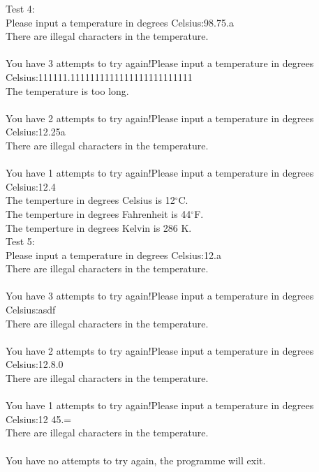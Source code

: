 \documentclass[12pt]{article}
\begin{document}
	\noindent Test 4:\\
	Please input a temperature in degrees Celsius:98.75.a\\
	There are illegal characters in the temperature.\\\\	
	You have 3 attempts to try again!Please input a temperature in degrees Celsius:111111.1111111111111111111111111\\
	The temperature is too long.\\\\	
	You have 2 attempts to try again!Please input a temperature in degrees Celsius:12.25a\\
	There are illegal characters in the temperature.\\\\	
	You have 1 attempts to try again!Please input a temperature in degrees Celsius:12.4\\
	The temperture in degrees Celsius is 12$^\circ$C.\\
	The temperture in degrees Fahrenheit is 44$^\circ$F.\\
	The temperture in degrees Kelvin is 286 K.\\
	
	\noindent Test 5:\\
	Please input a temperature in degrees Celsius:12.a\\
	There are illegal characters in the temperature.\\\\	
	You have 3 attempts to try again!Please input a temperature in degrees Celsius:asdf\\
	There are illegal characters in the temperature.\\\\	
	You have 2 attempts to try again!Please input a temperature in degrees Celsius:12.8.0\\
	There are illegal characters in the temperature.\\\\	
	You have 1 attempts to try again!Please input a temperature in degrees Celsius:12 45.=\\
	There are illegal characters in the temperature.\\\\	
	You have no attempts to try again, the programme will exit.
	
\end{document}
